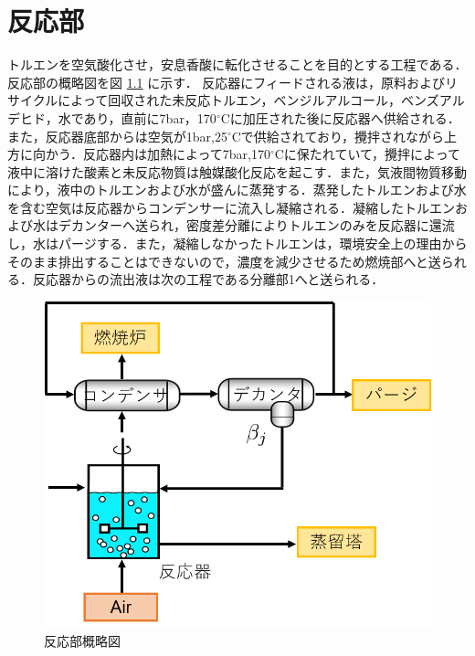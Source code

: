 \documentclass[a4j]{jsreport}
\begin{document}
\newpage
\chapter{反応部}
トルエンを空気酸化させ，安息香酸に転化させることを目的とする工程である．
反応部の概略図を図 \ref{反応部設計結果の概略図} に示す．
反応器にフィードされる液は，原料およびリサイクルによって回収された未反応トルエン，ベンジルアルコール，ベンズアルデヒド，水であり，直前に7bar，170$^\circ$Cに加圧された後に反応器へ供給される．また，反応器底部からは空気が1bar,25$^\circ$Cで供給されており，攪拌されながら上方に向かう．反応器内は加熱によって7bar,170$^\circ$Cに保たれていて，攪拌によって液中に溶けた酸素と未反応物質は触媒酸化反応を起こす．また，気液間物質移動により，液中のトルエンおよび水が盛んに蒸発する．蒸発したトルエンおよび水を含む空気は反応器からコンデンサーに流入し凝縮される．凝縮したトルエンおよび水はデカンターへ送られ，密度差分離によりトルエンのみを反応器に還流し，水はパージする．また，凝縮しなかったトルエンは，環境安全上の理由からそのまま排出することはできないので，濃度を減少させるため燃焼部へと送られる．反応器からの流出液は次の工程である分離部1へと送られる．
\begin{figure}[htbp]
    \begin{center}
        \includegraphics[scale=0.7]{ReactionSection.png}
        \caption{反応部概略図}
        \label{反応部設計結果の概略図}
    \end{center}
\end{figure}
\end{document}

